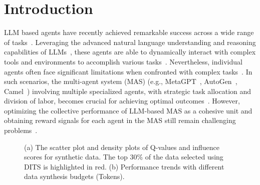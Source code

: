 \section{Introduction}
\label{section:introduction}

LLM based agents have recently achieved remarkable success across a wide range of tasks~\cite{202412.2294, Wang_2024, xi2023risepotentiallargelanguage, zhang2024largelanguagemodelbrainedgui}. Leveraging the advanced natural language understanding and reasoning capabilities of LLMs~\cite{DBLP:journals/corr/abs-2303-08774, DBLP:conf/nips/Wei0SBIXCLZ22}, these agents are able to dynamically interact with complex tools and environments to accomplish various tasks~\cite{ DBLP:journals/corr/abs-2310-05915, DBLP:conf/iclr/YaoZYDSN023}. Nevertheless, individual agents often face significant limitations when confronted with complex tasks~\cite{DBLP:conf/emnlp/ShiYWWF24}. In such scenarios, the multi-agent system (MAS) (e.g., MetaGPT~\cite{DBLP:conf/iclr/HongZCZCWZWYLZR24}, AutoGen~\cite{DBLP:journals/corr/abs-2308-08155}, Camel~\cite{DBLP:conf/nips/LiHIKG23}) involving multiple specialized agents, with strategic task allocation and division of labor, becomes crucial for achieving optimal outcomes~\cite{DBLP:conf/ijcai/GuoCWCPCW024}. However, optimizing the collective performance of LLM-based MAS as a cohesive unit and obtaining reward signals for each agent in the MAS still remain challenging problems~\cite{DBLP:journals/corr/abs-2410-08115}.


\begin{figure}
    \centering
    \caption{(a) The scatter plot and density plots of Q-values and influence scores for synthetic data. The top 30\% of the data selected using DITS is highlighted in red. (b) Performance trends with different data synthesis budgets (Tokens).}
    \vspace{-10pt}
    \label{fig:scaling}
\end{figure}

